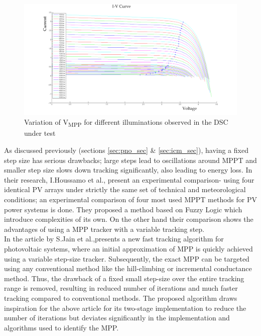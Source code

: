       
    \begin{figure}[H]
     \begin{center}
     \includegraphics[width=1.2\textwidth]{images/IV_50-500}
     \caption{Variation of V\textsubscript{MPP} for different illuminations observed in the DSC under test }
     \label{fig:vmmp_lux50_5000}
     \end{center}
     \end{figure}
   
 
As discussed previously (sections \ref{sec:pno_sec} \& \ref{sec:icm_sec}), having a fixed step size has serious drawbacks; large steps lead to oscillations around \ac{MPPT} and smaller step size slows down tracking significantly, also leading to energy loss. In their research, I.Houssamo et al.\cite{houssamo2013experimental}, present an experimental comparison- using four identical \ac{PV} arrays under strictly the same set of technical and meteorological conditions; an experimental comparison  of four most used MPPT methods for \ac{PV} power systems is done. They  proposed a method based on Fuzzy Logic which introduce complexities of its own. On the other hand their comparison shows the advantages of using a \ac{MPP} tracker with a variable tracking step.\\  

In the article by S.Jain et al.\cite{jain2004new},presents a new fast tracking algorithm for photovoltaic systems, where an initial approximation of \ac{MPP} is quickly achieved using a variable step-size tracker. Subsequently, the exact \ac{MPP} can be targeted using any conventional method like the hill-climbing or incremental conductance method. Thus, the drawback of a fixed small step-size over the entire tracking range is removed, resulting in reduced number of iterations and much faster tracking compared to conventional methods. The proposed algorithm draws inspiration for the above article for its two-stage implementation to reduce the number of iterations but deviates significantly in the implementation and algorithms used to identify the \ac{MPP}.\\ 
 


